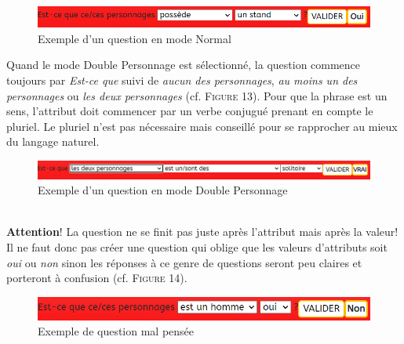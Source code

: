 \documentclass{article}
\begin{document}
                \begin{figure}[h]
                    \centering \includegraphics[width=12cm]{images/exempleQuestionNormal.png}
                    \caption{Exemple d'un question en mode Normal}
                \end{figure}
                \par Quand le mode \textsf{Double Personnage} est sélectionné, la question commence toujours par \textit{Est-ce que} suivi de \textsl{aucun des personnages}, \textsl{au moins un des personnages} ou \textsl{les deux personnages} (cf. \textsc{Figure 13}). Pour que la phrase est un sens, l'attribut doit commencer par un verbe conjugué prenant en compte le pluriel. Le pluriel n'est pas nécessaire mais conseillé pour se rapprocher au mieux du langage naturel.\\
                \begin{figure}[h]
                    \centering \includegraphics[width=12cm]{images/exempleQuestionDouble.png}
                    \caption{Exemple d'un question en mode Double Personnage}
                \end{figure}\\
                
                {\large \textbf{Attention}!} La question ne se finit pas juste après l'attribut mais après la valeur! Il ne faut donc pas créer une question qui oblige que les valeurs d'attributs soit \textit{oui} ou \textit{non} sinon les réponses à ce genre de questions seront peu claires et porteront à confusion (cf. \textsc{Figure 14}).\\
                \begin{figure}[h]
                    \centering \includegraphics[width=12cm]{images/exempleQuestionMalFaite.png}
                    \caption{Exemple de question mal pensée}
                \end{figure}
            \pagebreak
            
\end{document}
